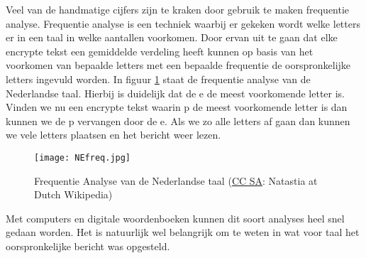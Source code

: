 Veel van de handmatige cijfers zijn te kraken door gebruik te maken frequentie analyse. Frequentie analyse is een techniek waarbij er gekeken wordt welke letters er in een taal in welke aantallen voorkomen. Door ervan uit te gaan dat elke encrypte tekst een gemiddelde verdeling heeft kunnen op basis van het voorkomen van bepaalde letters met een bepaalde frequentie de oorspronkelijke letters ingevuld worden. In figuur \ref{fig:NEfreq} staat de frequentie analyse van de Nederlandse taal. Hierbij is duidelijk dat de e de meest voorkomende letter is. Vinden we nu een encrypte tekst waarin p de meest voorkomende letter is dan kunnen we de p vervangen door de e. Als we zo alle letters af gaan dan kunnen we vele letters plaatsen en het bericht weer lezen.

\begin{figure}[h]
	\texttt{[image: NEfreq.jpg]}
	\caption{Frequentie Analyse van de Nederlandse taal (\href{https://commons.wikimedia.org/wiki/File:NEfreq.jpg}{CC SA}: Natastia at Dutch Wikipedia)}
	\label{fig:NEfreq}
\end{figure}

Met computers en digitale woordenboeken kunnen dit soort analyses heel snel gedaan worden. Het is natuurlijk wel belangrijk om te weten in wat voor taal het oorspronkelijke bericht was opgesteld.
